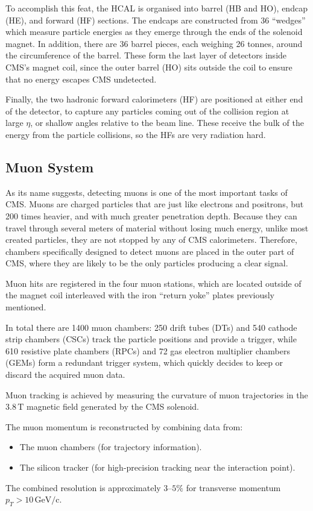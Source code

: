 To accomplish this feat, the HCAL is organised into barrel (HB and HO), endcap (HE), and forward (HF) sections. The endcaps are constructed from 36 ``wedges'' which measure particle energies as they emerge through the ends of the solenoid magnet. In addition, there are 36 barrel pieces, each weighing 26 tonnes, around the circumference of the barrel. These form the last layer of detectors inside CMS's magnet coil, since the outer barrel (HO) sits outside the coil to ensure that no energy escapes CMS undetected. 

Finally, the two hadronic forward calorimeters (HF) are positioned at either end of the detector, to capture any particles coming out of the collision region at large $\eta$, or shallow angles relative to the beam line. These receive the bulk of the energy from the particle collisions, so the HFs are very radiation hard.

\subsection{Muon System}

As its name suggests, detecting muons is one of the most important tasks of CMS. Muons are charged particles that are just like electrons and positrons, but 200 times heavier, and with much greater penetration depth. 
Because they can travel through several meters of material without losing much energy, unlike most created particles, they are not stopped by any of CMS calorimeters. Therefore, chambers specifically designed to detect muons are placed in the outer part of CMS, where they are likely to be the only particles producing a clear signal.



Muon hits are registered in the four muon stations, which are located outside of the magnet coil interleaved with the iron ``return yoke'' plates previously mentioned.

In total there are 1400 muon chambers: 250 drift tubes (DTs) and 540 cathode strip chambers (CSCs) track the particle positions and provide a trigger, while 610 resistive plate chambers (RPCs) and 72 gas electron multiplier chambers (GEMs) form a redundant trigger system, which quickly decides to keep or discard the acquired muon data. 


Muon tracking is achieved by measuring the curvature of muon trajectories in the $3.8\,\mathrm{T}$ magnetic field generated by the CMS solenoid.

The muon momentum is reconstructed by combining data from:
\begin{itemize}
	\item The muon chambers (for trajectory information).
	\item The silicon tracker (for high-precision tracking near the interaction point).
\end{itemize}
The combined resolution is approximately $3$--$5\%$ for transverse momentum $p_T > 10\,\mathrm{GeV/c}$.

